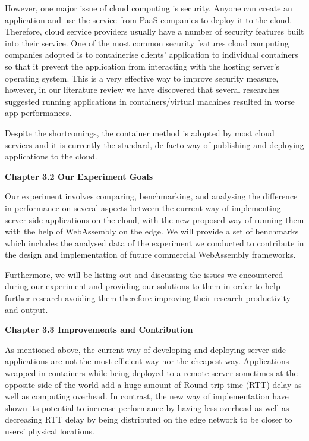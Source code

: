 However, one major issue of cloud computing is security. Anyone can create an application and use the service from PaaS companies to deploy it to the cloud. Therefore, cloud service providers usually have a number of security features built into their service. One of the most common security features cloud computing companies adopted is to containerise clients' application to individual containers so that it prevent the application from interacting with the hosting server's operating system. This is a very effective way to improve security measure, however, in our literature review we have discovered that several researches suggested running applications in containers/virtual machines resulted in worse app performances.

Despite the shortcomings, the container method is adopted by most cloud services and it is currently the standard, de facto way of publishing and deploying applications to the cloud.

\bigskip
\textbf{{\Large Chapter 3.2 Our Experiment Goals}}

Our experiment involves comparing, benchmarking, and analysing the difference in performance on several aspects between the current way of implementing server-side applications on the cloud, with the new proposed way of running them with the help of WebAssembly on the edge. We will provide a set of benchmarks which includes the analysed data of the experiment we conducted to contribute in the design and implementation of future commercial WebAssembly frameworks.

Furthermore, we will be listing out and discussing the issues we encountered during our experiment and providing our solutions to them in order to help further research avoiding them therefore improving their research productivity and output.

\bigskip
\textbf{{\Large Chapter 3.3 Improvements and Contribution}}

As mentioned above, the current way of developing and deploying server-side applications are not the most efficient way nor the cheapest way. Applications wrapped in containers while being deployed to a remote server sometimes at the opposite side of the world add a huge amount of Round-trip time (RTT) delay as well as computing overhead. In contrast, the new way of implementation have shown its potential to increase performance by having less overhead as well as decreasing RTT delay by being distributed on the edge network to be closer to users' physical locations.

